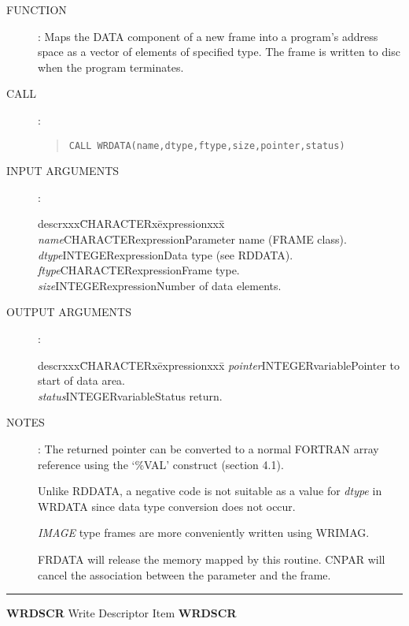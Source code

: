 \begin{description}
\item [FUNCTION]:
Maps the DATA component of a new frame into a program's address space as a
vector of elements of specified type.
The frame is written to disc when the program terminates.
\item [CALL]:
\begin{quote}
{\tt CALL WRDATA(name,dtype,ftype,size,pointer,status)}
\end{quote}
\item [INPUT ARGUMENTS]:
\begin{tabbing}
descrxxx\=CHARACTERx\=expressionxxx\=\kill
{\em name}\>CHARACTER\>expression\>Parameter name (FRAME class).\\
{\em dtype}\>INTEGER\>expression\>Data type (see RDDATA).\\
{\em ftype}\>CHARACTER\>expression\>Frame type.\\
{\em size}\>INTEGER\>expression\>Number of data elements.
\end{tabbing}
\item [OUTPUT ARGUMENTS]:
\begin{tabbing}
descrxxx\=CHARACTERx\=expressionxxx\=\kill
{\em pointer}\>INTEGER\>variable\>Pointer to start of data area.\\
{\em status}\>INTEGER\>variable\>Status return.
\end{tabbing}
\item [NOTES]:
The returned pointer can be converted to a normal FORTRAN array reference using
the `\%VAL' construct (section 4.1).

Unlike RDDATA, a negative code is not suitable as a value for {\em dtype} in
WRDATA since data type conversion does not occur.

{\em IMAGE} type frames are more conveniently written using WRIMAG.

FRDATA will release the memory mapped by  this routine.
CNPAR will cancel the association between the parameter and the frame.
\end{description}
\rule{\textwidth}{0.3mm}
{\Large {\bf WRDSCR} \hfill Write Descriptor Item \hfill {\bf WRDSCR}}
